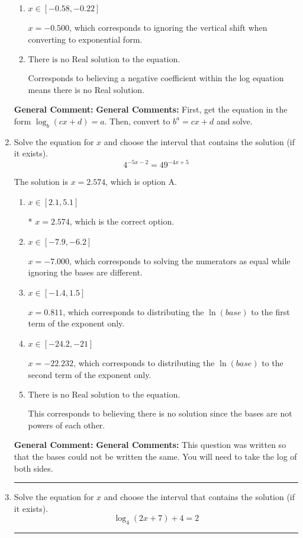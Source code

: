 \documentclass{extbook}[14pt]
\newcommand{\litem}[1]{\item #1

\rule{\textwidth}{0.4pt}}
\begin{document}
\begin{enumerate}
{\begin{enumerate}[label=\Alph*.]
$x = 5.500$, which corresponds to reversing the base and exponent when converting and reversing the value with $x$.
\item \( x \in [-0.58, -0.22] \)

$x = -0.500$, which corresponds to ignoring the vertical shift when converting to exponential form.
\item \( \text{There is no Real solution to the equation.} \)

Corresponds to believing a negative coefficient within the log equation means there is no Real solution.
\end{enumerate}

\textbf{General Comment:} \textbf{General Comments:} First, get the equation in the form $\log_b{(cx+d)} = a$. Then, convert to $b^a = cx+d$ and solve.
}
\litem{
Solve the equation for $x$ and choose the interval that contains the solution (if it exists).
\[ 4^{-5x-2} = 49^{-4x+5} \]

The solution is \( x = 2.574 \), which is option A.\begin{enumerate}[label=\Alph*.]
\item \( x \in [2.1, 5.1] \)

* $x = 2.574$, which is the correct option.
\item \( x \in [-7.9, -6.2] \)

$x = -7.000$, which corresponds to solving the numerators as equal while ignoring the bases are different.
\item \( x \in [-1.4, 1.5] \)

$x = 0.811$, which corresponds to distributing the $\ln(base)$ to the first term of the exponent only.
\item \( x \in [-24.2, -21] \)

$x = -22.232$, which corresponds to distributing the $\ln(base)$ to the second term of the exponent only.
\item \( \text{There is no Real solution to the equation.} \)

This corresponds to believing there is no solution since the bases are not powers of each other.
\end{enumerate}

\textbf{General Comment:} \textbf{General Comments:} This question was written so that the bases could not be written the same. You will need to take the log of both sides.
}
\litem{
Solve the equation for $x$ and choose the interval that contains the solution (if it exists).
\[ \log_{4}{(2x+7)}+4 = 2 \]

}
\end{enumerate}
\end{document}
